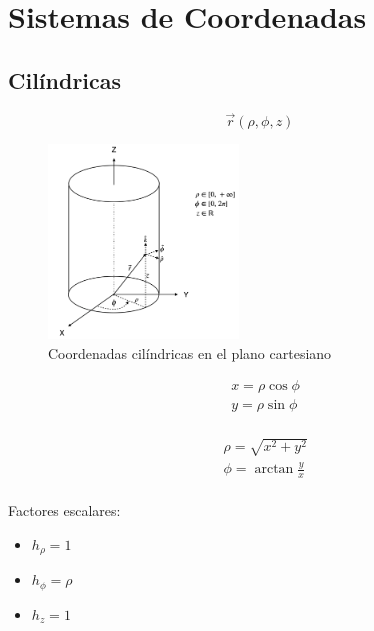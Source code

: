 \section{Sistemas de Coordenadas}

\subsection{Cilíndricas}

\[\Vec{r}(\rho,\phi,z)\]

\begin{figure}[H]
    \centering
    \includegraphics[width=0.45\textwidth]{Resultados Útiles/imgs/coords_cilind_DFI.png}
    \caption{Coordenadas cilíndricas en el plano cartesiano}
    \label{fig:C.cilindricas}
\end{figure}

\begin{minipage}{0.55\textwidth}
\begin{equation}
\begin{split}
    &x = \rho\cos{\phi}\\
    &y = \rho\sin{\phi}\\
\end{split}
\nonumber
\end{equation}
\end{minipage}
\begin{minipage}{0.35\textwidth}
\begin{equation}
\begin{split}
    & \rho = \sqrt{x^2+y^2}\\
    & \phi = \arctan{\frac{y}{x}}\\
\end{split}
\nonumber
\end{equation}
\end{minipage}

\bigbreak
Factores escalares:
\begin{itemize}
    \item $h_\rho = 1$
    \item $h_\phi = \rho$
    \item $h_z = 1$
\end{itemize}

